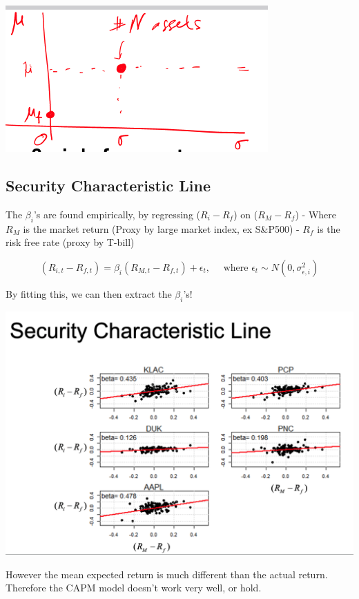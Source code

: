 \documentclass[
  oneside]{book}
\begin{document}
\includegraphics{Notes/Obsidian-Attachments/5-Portfolio-Theory-5.png}

\hypertarget{security-characteristic-line}{%
\subsection{Security Characteristic Line}\label{security-characteristic-line}}

The \(\beta_{i}\)'s are found empirically, by regressing (\(R_{i}-R_{f}\)) on (\(R_{M}-R_{f}\))
- Where \(R_{M}\) is the market return (Proxy by large market index, ex S\&P500)
- \(R_{f}\) is the risk free rate (proxy by T-bill)

\[
(R_{i,t} - R_{f,t}) = \beta_{i}(R_{M,t}-R_{f,t})+\epsilon_{t}, \quad \text{ where } \epsilon_{t} \sim N(0,\sigma^{2}_{\epsilon,i})
\]

By fitting this, we can then extract the \(\beta_{i}\)'s!

\includegraphics{Notes/Obsidian-Attachments/4-Factor-Models.png}

However the mean expected return is much different than the actual return. Therefore the CAPM model doesn't work very well, or hold.
\end{document}
